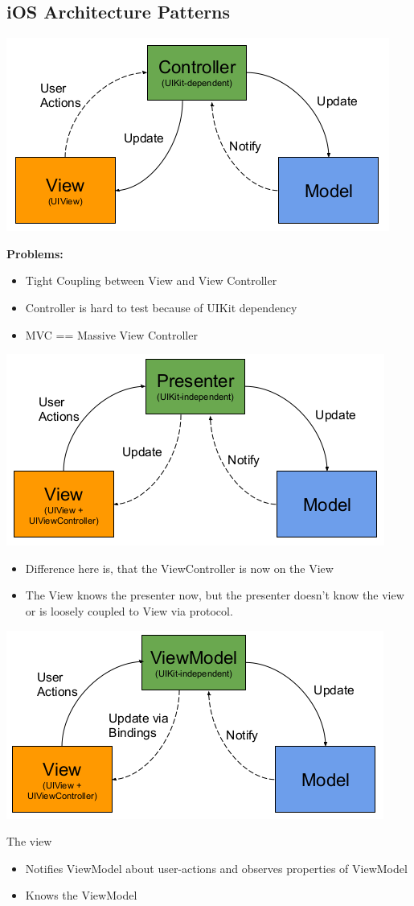 \subsection{iOS Architecture Patterns}

\begin{breakbox}

\includegraphics[width=.15\textwidth]{figures/mvc.png}

\textbf{Problems:}

\begin{itemize}
\tightlist
\item
  Tight Coupling between View and View Controller
\item
  Controller is hard to test because of UIKit dependency
\item
  MVC == Massive View Controller
\end{itemize}
\end{breakbox}

\begin{breakbox}

\includegraphics[width=.15\textwidth]{figures/mvp.png}

\begin{itemize}
\tightlist
\item
  Difference here is, that the ViewController is now on the View
\item
  The View knows the presenter now, but the presenter doesn't know the
  view or is loosely coupled to View via protocol.
\end{itemize}
\end{breakbox}

\begin{breakbox}

\includegraphics[width=.15\textwidth]{figures/mvvm.png}

The view

\begin{itemize}
\tightlist
\item
  Notifies ViewModel about user-actions and observes properties of
  ViewModel
\item
  Knows the ViewModel
\end{itemize}
\end{breakbox}


